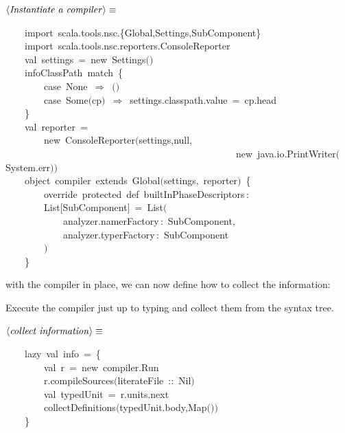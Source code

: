 \documentclass[a4paper,12pt]{article}
\begin{document}
$\left<\mbox{\emph{Instantiate a compiler}}\right>\equiv$
\begin{program}~~~~{\vem import}~scala.tools.nsc.{\small\{}Global,Settings,SubComponent{\small\}}
\\~~~~{\vem import}~scala.tools.nsc.reporters.ConsoleReporter
\\[0.5em]~~~~{\vem val}~settings~=~{\vem new}~Settings$($$)$
\\~~~~infoClassPath~{\vem match}~{\small\{}
\\~~~~~~~~{\vem case}~None~$\Rightarrow$~$($$)$
\\~~~~~~~~{\vem case}~Some$($cp$)$~$\Rightarrow$~settings.classpath.value~=~cp.head
\\~~~~{\small\}}
\\[0.5em]~~~~{\vem val}~reporter~=
\\~~~~~~~~{\vem new}~ConsoleReporter$($settings,{\vem null},
\\~~~~~~~~~~~~~~~~~~~~~~~~~~~~~~~~~~~~~~~~~~~~~~~~{\vem new}~java.io.PrintWriter$($System.err$)$$)$
\\~~~~{\vem object}~compiler~{\vem extends}~Global$($settings,~reporter$)$~{\small\{}
\\~~~~~~~~{\vem override}~{\vem protected}~{\vem def}~builtInPhaseDescriptors\,{\rm :}
\\~~~~~~~~List$[$SubComponent$]$~=~List$($
\\~~~~~~~~~~~~analyzer.namerFactory\,{\rm :}~SubComponent,
\\~~~~~~~~~~~~analyzer.typerFactory\,{\rm :}~SubComponent
\\~~~~~~~~$)$
\\~~~~{\small\}}
\\[0.5em]\end{program}



with the compiler in place, we can now define how to collect the information:

Execute the compiler just up to typing and collect them from the syntax tree.

$\left<\mbox{\emph{collect information}}\right>\equiv$
\begin{program}~~~~{\vem lazy}~{\vem val}~info~=~{\small\{}
\\~~~~~~~~{\vem val}~r~=~{\vem new}~compiler.Run
\\~~~~~~~~r.compileSources$($literateFile~{\rm :}{\rm :}~Nil$)$
\\[0.5em]~~~~~~~~{\vem val}~typedUnit~=~r.units.next
\\[0.5em]~~~~~~~~collectDefinitions$($typedUnit.body,Map$($$)$$)$
\\~~~~{\small\}}
\\[0.5em]\end{program}
\end{document}

